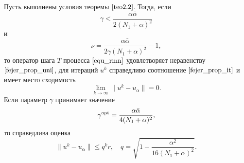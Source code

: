 \begin{theorem} \label{teo2.3} 
	Пусть выполнены условия теоремы $\ref{teo2.2}$. Тогда, если
	\begin{equation}\label{ineq2.12}
	\gamma<\frac{\alpha\bar\alpha}{2(N_1+\alpha)^2}
	\end{equation}
	и \begin{equation}\label{eq2.13}
	\nu=\frac{\alpha\bar\alpha}{2\gamma(N_1+\alpha)^2}-1,
	\end{equation}
	то оператор шага $T$ процесса $\eqref{equ_rmn}$ удовлетворяет неравенству $\eqref{fejer_prop_uni}$, для итераций $u^k$ справедливо соотношение $\eqref{fejer_prop_it}$ и имеет место сходимость
	\begin{equation}\label{eq2.14}
	\lim_{k\to\infty}\|u^k-u_\alpha\|=0.
	\end{equation}
	Если параметр $\gamma$ принимает значение \begin{equation}\label{eq2.15}
	\gamma^{\textnormal{opt}}=\frac{\alpha\bar\alpha}{4(N_1+\alpha)^2},
	\end{equation} то справедлива оценка \begin{equation}\label{est2.16}
	\|u^k-u_\alpha\|\le q^k r, \quad q=\sqrt{1-\frac{{\alpha}^2}  {16(N_1+\alpha)^2}}.\end{equation}
\end{theorem}
